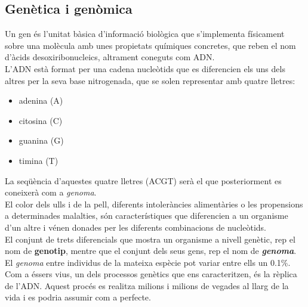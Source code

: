 \subsection{Genètica i genòmica}
\label{estatArt:genomica_genetica}
Un gen és l'unitat bàsica d'informació biològica que s'implementa físicament sobre una molècula amb unes propietats químiques concretes, que reben el nom d'àcids desoxiribonucleics, altrament coneguts com ADN.\\
\newline L'ADN està format per una cadena nucleòtids que es diferencien els uns dels altres per la seva base nitrogenada, que se solen representar amb quatre lletres:
\begin{itemize}
    \item adenina (A)
    \item citosina (C)
    \item guanina (G)
    \item timina (T)
\end{itemize}
La seqüència d'aquestes quatre lletres (ACGT) serà el que posteriorment es coneixerà com a \textit{genoma}.\\
\newline El color dels ulls i de la pell, diferents intoleràncies alimentàries o les propensions a determinades malalties, són característiques que diferencien a un organisme d'un altre i vénen donades per les diferents combinacions de nucleòtids.\\
\newline El conjunt de trets diferencials que mostra un organisme a nivell genètic, rep el nom de \textbf{genotip}, mentre que el conjunt dels seus gens, rep el nom de \textbf{\textit{genoma}}.\\
\newline El \textit{genoma} entre individus de la mateixa espècie pot variar entre ells un 0.1\%.\\
\newline Com a éssers vius, un dels processos genètics que ens caracteritzen, és la rèplica de l'ADN. Aquest procés es realitza milions i milions de vegades al llarg de la vida i es podria assumir com a perfecte.\\
